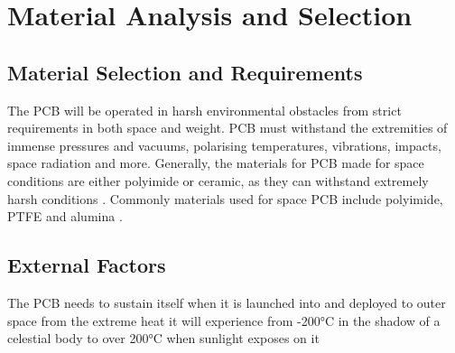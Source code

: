 \section{Material Analysis and Selection}


\subsection{Material Selection and Requirements}
The PCB will be operated in harsh environmental obstacles from strict 
requirements in both space and weight. PCB must withstand the extremities 
of immense pressures and vacuums, polarising temperatures, vibrations, 
impacts, space radiation and more. Generally, the materials for PCB made 
for space conditions are either polyimide or ceramic, as they can withstand 
extremely harsh conditions \cite{ABLcircuits}. Commonly materials used for 
space PCB include polyimide, PTFE and alumina \cite{CadenceDesignSystems2025}.

\subsection{External Factors}
The PCB needs to sustain itself when it is launched into and deployed to 
outer space from the extreme heat it will experience from -200°C in the 
shadow of a celestial body to over 200°C when sunlight exposes on it 

